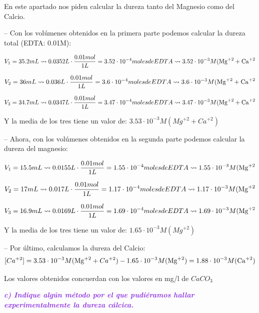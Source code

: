\noindent En este apartado nos piden calcular la dureza tanto del Magnesio como del Calcio.

-- Con los volúmenes obtenidos en la primera parte podemos calcular la dureza total (EDTA: 0.01M):

\[V_1 = 35.2 mL \rightsquigarrow 0.0352 L \cdot \frac{0.01 mol}{1 L} = 3.52\cdot{10^{-4}} moles de EDTA  \rightsquigarrow 3.52\cdot{10^{-3}} M  (\ce{Mg}^{+2} + \ce{Ca}^{+2}\]

\[V_2 = 36 mL \rightsquigarrow 0.036 L \cdot \frac{0.01 mol}{1 L} = 3.6\cdot{10^{-4}} moles de EDTA  \rightsquigarrow 3.6\cdot{10^{-3}} M  (\ce{Mg}^{+2} + \ce{Ca}^{+2}\]

\[V_3 = 34.7 mL \rightsquigarrow 0.0347 L \cdot \frac{0.01 mol}{1 L} = 3.47\cdot{10^{-4}} moles de EDTA  \rightsquigarrow 3.47\cdot{10^{-3}} M (\ce{Mg}^{+2} + \ce{Ca}^{+2}\]

\noindent Y la media de los tres tiene un valor de: $3.53\cdot{10^{-3}} M (Mg^{+2} + Ca^{+2})$

\vspace{0.3cm}

-- Ahora, con los volúmenes obtenidos en la segunda parte podemos calcular la dureza del magnesio:

\[V_1 = 15.5 mL \rightsquigarrow 0.0155 L \cdot \frac{0.01 mol}{1 L} = 1.55\cdot{10^{-4}} moles de EDTA  \rightsquigarrow 1.55\cdot{10^{-3}} M (\ce{Mg}^{+2}\]

\[V_2 = 17 mL \rightsquigarrow 0.017 L \cdot \frac{0.01 mol}{1 L} = 1.17\cdot{10^{-4}} moles de EDTA  \rightsquigarrow 1.17\cdot{10^{-3}} M (\ce{Mg}^{+2}\]

\[V_3 = 16.9 mL \rightsquigarrow 0.0169 L \cdot \frac{0.01 mol}{1 L} = 1.69\cdot{10^{-4}} moles de EDTA  \rightsquigarrow 1.69\cdot{10^{-3}} M (\ce{Mg}^{+2}\]


\noindent Y la media de los tres tiene un valor de: \underline{$1.65\cdot{10^{-3}} M (Mg^{+2})$}

\vspace{0.2cm}

-- Por último, calculamos la dureza del Calcio:
\[ [Ca^{+2}] =  3.53\cdot{10^{-3}} M (\ce{Mg}^{+2} + Ca^{+2}) - 1.65\cdot{10^{-3}} M (\ce{Mg}^{+2}) = 1.88\cdot{10^{-3}} M (\ce{Ca}^{+2})\]

\noindent Los valores obtenidos concuerdan con los valores en mg/l de $CaCO_3$

\clearpage

\noindent\textcolor{BlueViolet}{\textbf{\textit{c) Indique algún método por el que pudiéramos hallar experimentalmente la dureza cálcica.}}}



